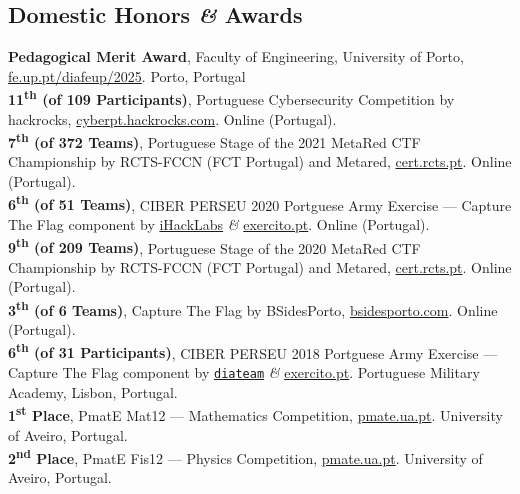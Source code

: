 \documentclass[10pt, a4paper]{article}
\newcommand{\FEUP}{Faculty of Engineering, University of Porto}
\newcommand{\years}[1]{\marginnote{\raggedleft\footnotesize #1}}
\let\oldhref\href
\renewcommand{\href}[2]{\oldhref{#1}{{\small #2}}}
\begin{document}
\subsection*{Domestic Honors \textit{\&} Awards}
\years{2024} 
\textbf{Pedagogical Merit Award}, \FEUP, \href{https://fe.up.pt/diafeup/2025/premios-e-homenagens/premios-de-reconhecimento-pedagogico/}{fe.up.pt/diafeup/2025}. Porto, Portugal
\\[0.42em]
\years{2022} 
\textbf{11\textsuperscript{th} \small{(of 109 Participants)}},  Portuguese Cybersecurity Competition by hackrocks, \href{https://cyberpt.hackrocks.com/}{cyberpt.hackrocks.com}. Online (Portugal).
\\[0.42em]
\years{2021} 
\textbf{7\textsuperscript{th} \small{(of 372 Teams)}}, Portuguese Stage of the 2021 MetaRed CTF Championship by RCTS-FCCN (FCT Portugal) and Metared, \href{https://cert.rcts.pt/}{cert.rcts.pt}. Online (Portugal).
\\[0.42em]
\years{2020}  
\textbf{6\textsuperscript{th} \small{(of 51 Teams)}}, CIBER PERSEU 2020 Portguese Army Exercise --- Capture The Flag component by \href{https://www.ihacklabs.com/}{iHackLabs} \textit{\&} \href{http://exercito.pt/}{exercito.pt}. Online (Portugal).
\\[0.42em]
\textbf{9\textsuperscript{th} \small{(of 209 Teams)}}, Portuguese Stage of the 2020 MetaRed CTF Championship by RCTS-FCCN (FCT Portugal) and Metared, \href{https://cert.rcts.pt/}{cert.rcts.pt}. Online (Portugal).
\\[0.42em]
\textbf{3\textsuperscript{th} \small{(of 6 Teams)}}, Capture The Flag by BSidesPorto, \href{https://bsidesporto.com/}{bsidesporto.com}. Online (Portugal).
\\[0.42em]
\years{2018}  
\textbf{6\textsuperscript{th} \small{(of 31 Participants)}}, CIBER PERSEU 2018 Portguese Army Exercise --- Capture The Flag component by \href{https://www.diateam.net}{\texttt{diateam}} \textit{\&} \href{http://exercito.pt/}{exercito.pt}. Portuguese Military Academy, Lisbon, Portugal.
\\[0.42em]
\years{2011} 
\textbf{1\textsuperscript{st} Place}, PmatE Mat12 --- Mathematics Competition, \href{http://pmate.ua.pt/}{pmate.ua.pt}. University of Aveiro, Portugal.
\\[0.42em]
\years{2009}  
\textbf{2\textsuperscript{nd} Place}, PmatE Fis12 --- Physics Competition, 
\href{http://pmate.ua.pt/}{pmate.ua.pt}. University of Aveiro, Portugal.


\end{document}
